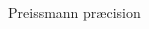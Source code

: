 \begin{frame}{Preissmann præcision}{}
\vfill\vfill\centering
	\begin{columns}
	\begin{column}{0.5\textwidth}
		\begin{figure}[H]
			\centering
 			
		\end{figure}
	\end{column}

	\begin{column}{0.5\textwidth}
		\begin{figure}[H]
			\centering
 			
		\end{figure}
	\end{column}
\end{columns}
\vfill\vfill		
\end{frame}




